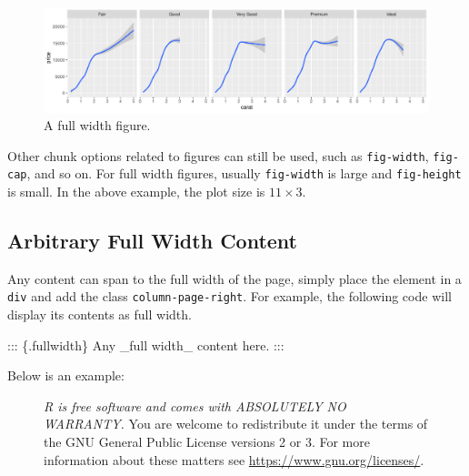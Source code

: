 \documentclass[
  letterpaper,
  DIV=11,
  numbers=noendperiod,
  oneside]{scrartcl}
\newenvironment{Shaded}{\begin{snugshade}}{\end{snugshade}}
\newcommand{\NormalTok}[1]{\textcolor[rgb]{0.00,0.23,0.31}{#1}}
\begin{document}
\begin{figure}[H]

{\centering \includegraphics{HousePrices_files/figure-pdf/fig-fullwidth-1.pdf}

}

\caption{\label{fig-fullwidth}A full width figure.}

\end{figure}

Other chunk options related to figures can still be used, such as
\texttt{fig-width}, \texttt{fig-cap}, and so on. For full width figures,
usually \texttt{fig-width} is large and \texttt{fig-height} is small. In
the above example, the plot size is \(11 \times 3\).

\hypertarget{arbitrary-full-width-content}{%
\subsection{Arbitrary Full Width
Content}\label{arbitrary-full-width-content}}

Any content can span to the full width of the page, simply place the
element in a \texttt{div} and add the class \texttt{column-page-right}.
For example, the following code will display its contents as full width.

\begin{Shaded}
\begin{Highlighting}[]
\NormalTok{::: \{.fullwidth\}}
\NormalTok{Any \_full width\_ content here.}
\NormalTok{:::}
\end{Highlighting}
\end{Shaded}

Below is an example:

\begin{figure}

\emph{R is free software and comes with ABSOLUTELY NO WARRANTY.} You are
welcome to redistribute it under the terms of the GNU General Public
License versions 2 or 3. For more information about these matters see
\url{https://www.gnu.org/licenses/}.

\end{figure}
\end{document}
